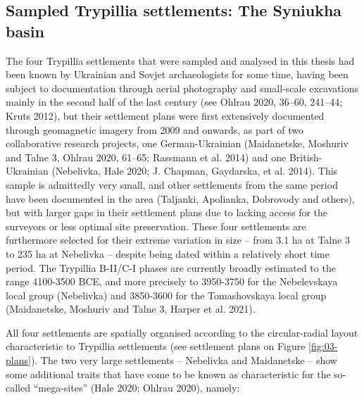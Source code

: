 \documentclass[
  12pt,
  a4paper, twoside]{book}
\begin{document}
\hypertarget{sampled-trypillia-settlements-the-syniukha-basin}{%
\subsection{Sampled Trypillia settlements: The Syniukha basin}\label{sampled-trypillia-settlements-the-syniukha-basin}}

The four Trypillia settlements that were sampled and analysed in this thesis had been known by Ukrainian and Sovjet archaeologists for some time, having been subject to documentation through aerial photography and small-scale excavations mainly in the second half of the last century (see Ohlrau 2020, 36--60, 241--44; Kruts 2012), but their settlement plans were first extensively documented through geomagnetic imagery from 2009 and onwards, as part of two collaborative research projects, one German-Ukrainian (Maidanetske, Moshuriv and Talne 3, Ohlrau 2020, 61--65; Rassmann et al. 2014) and one British-Ukrainian (Nebelivka, Hale 2020; J. Chapman, Gaydarska, et al. 2014). This sample is admittedly very small, and other settlements from the same period have been documented in the area (Taljanki, Apolianka, Dobrovody and others), but with larger gaps in their settlement plans due to lacking access for the surveyors or less optimal site preservation. These four settlements are furthermore selected for their extreme variation in size -- from 3.1 ha at Talne 3 to 235 ha at Nebelivka -- despite being dated within a relatively short time period. The Trypillia B-II/C-I phases are currently broadly estimated to the range 4100-3500 BCE, and more precisely to 3950-3750 for the Nebelevskaya local group (Nebelivka) and 3850-3600 for the Tomashovskaya local group (Maidanetske, Moshuriv and Talne 3, Harper et al. 2021).

All four settlements are spatially organised according to the circular-radial layout characteristic to Trypillia settlements (see settlement plans on Figure \ref{fig:03-plans}). The two very large settlements -- Nebelivka and Maidanetske -- show some additional traits that have come to be known as characteristic for the so-called ``mega-sites'' (Hale 2020; Ohlrau 2020), namely:
\end{document}
